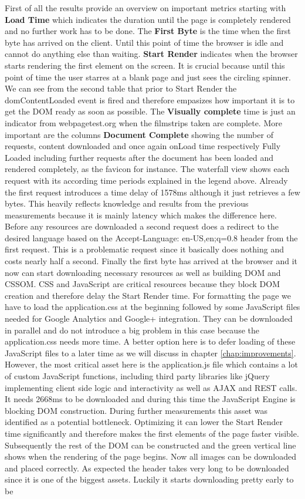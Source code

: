 First of all the results provide an overview on important metrics starting with \textbf{Load Time} which indicates the duration until the page is completely rendered and no further work has to be done. The \textbf{First Byte} is the time when the first byte has arrived on the client. Until this point of time the browser is idle and cannot do anything else than waiting. \textbf{Start Render} indicates when the browser starts rendering the first element on the screen. It is crucial because until this point of time the user starres at a blank page and just sees the circling spinner. We can see from the second table that prior to Start Render the domContentLoaded event is fired and therefore empasizes how important it is to get the DOM ready as soon as possible. The \textbf{Visually complete} time is just an indicator from webpagetest.org when the filmstrips taken are complete. More important are the columns \textbf{Document Complete} showing the number of requests, content downloaded and once again onLoad time respectively Fully Loaded including further requests after the document has been loaded and rendered completely, as the favicon for instance. The waterfall view shows each request with its according time periods explained in the legend above. Already the first request introduces a time delay of 1578ms although it just retrieves a few bytes. This heavily reflects knowledge and results from the previous measurements because it is mainly latency which makes the difference here. Before any resources are downloaded a second request does a redirect to the desired language based on the Accept-Language: en-US,en;q=0.8 header from the first request. This is a problematic request since it basically does nothing and costs nearly half a second. Finally the first byte has arrived at the browser and it now can start downloading necessary resources as well as building DOM and CSSOM. CSS and JavaScript are critical resources because they block DOM creation and therefore delay the Start Render time. For formatting the page we have to load the application.css at the beginning followed by some JavaScript files needed for Google Analytics and Google+ integration. They can be downloaded in parallel and do not introduce a big problem in this case because the application.css needs more time. A better option here is to defer loading of these JavaScript files to a later time as we will discuss in chapter \ref{chap:improvements}. However, the most critical asset here is the application.js file which contains a lot of custom JavaScript functions, including third party libraries like jQuery implementing client side logic and interactivity as well as AJAX and REST calls. It needs 2668ms to be downloaded and during this time the JavaScript Engine is blocking DOM construction. During further measurements this asset was identified as a potential bottleneck. Optimizing it can lower the Start Render time significantly and therefore makes the first elements of the page faster visible. Subsequently the rest of the DOM can be constructed and the green vertical line shows when the rendering of the page begins. Now all images can be downloaded and placed correctly. As expected the header takes very long to be downloaded since it is one of the biggest assets. Luckily it starts downloading pretty early to be 
